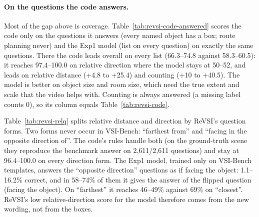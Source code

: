 \paragraph{On the questions the code answers.}
Most of the gap above is coverage. Table~\ref{tab:revsi-code-answered} scores the code only on the questions it answers
(every named object has a box; route planning never) and the Exp1 model (list on every question) on exactly the same
questions. There the code leads overall on every list (66.3--74.8 against 58.3--60.5): it reaches 97.4--100.0 on relative
direction where the model stays at 50--52, and leads on relative distance (+4.8 to +25.4) and counting (+10 to +40.5).
The model is better on object size and room size, which need the true extent and scale that the video helps with.
Counting is always answered (a missing label counts 0), so its column equals Table~\ref{tab:revsi-code}.

Table~\ref{tab:revsi-relq} splits relative distance and direction by ReVSI's question forms. Two forms never occur in
VSI-Bench: ``farthest from'' and ``facing in the opposite direction of''. The code's rules handle both (on the
ground-truth scene they reproduce the benchmark answer on 2,611/2,611 questions) and stay at 96.4--100.0 on every
direction form. The Exp1 model, trained only on VSI-Bench templates, answers the ``opposite direction'' questions
as if facing the object: 1.1--16.2\% correct, and in 58--74\% of them it gives the answer of the flipped question
(facing the object). On ``farthest'' it reaches 46--49\% against 69\% on ``closest''. ReVSI's low relative-direction
score for the model therefore comes from the new wording, not from the boxes.


